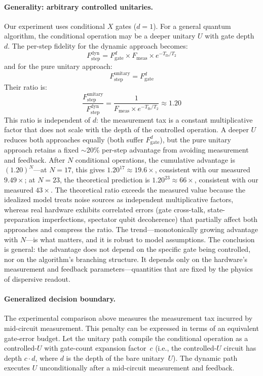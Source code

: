 \documentclass[11pt]{article}
\begin{document}
\paragraph{Generality: arbitrary controlled unitaries.}
Our experiment uses conditional $X$ gates ($d = 1$).
For a general quantum algorithm, the conditional operation may be a deeper unitary $U$ with gate depth $d$.
The per-step fidelity for the dynamic approach becomes:
\begin{equation}
F_\text{step}^\text{dyn} = F_\text{gate}^d \times F_\text{meas} \times e^{-T_\text{fb}/T_2}
\end{equation}
and for the pure unitary approach:
\begin{equation}
F_\text{step}^\text{unitary} = F_\text{gate}^d
\end{equation}
Their ratio is:
\begin{equation}
\frac{F_\text{step}^\text{unitary}}{F_\text{step}^\text{dyn}} = \frac{1}{F_\text{meas} \times e^{-T_\text{fb}/T_2}} \approx 1.20
\label{eq:ratio}
\end{equation}
This ratio is independent of $d$: the measurement tax is a constant multiplicative factor that does not scale with the depth of the controlled operation.
A deeper $U$ reduces both approaches equally (both suffer $F_\text{gate}^d$), but the pure unitary approach retains a fixed $\sim$20\% per-step advantage from avoiding measurement and feedback.
After $N$ conditional operations, the cumulative advantage is $(1.20)^N$---at $N = 17$, this gives $1.20^{17} \approx 19.6\times$, consistent with our measured $9.49\times$; at $N = 23$, the theoretical prediction is $1.20^{23} \approx 66\times$, consistent with our measured $43\times$.
The theoretical ratio exceeds the measured value because the idealized model treats noise sources as independent multiplicative factors, whereas real hardware exhibits correlated errors (gate cross-talk, state-preparation imperfections, spectator qubit decoherence) that partially affect both approaches and compress the ratio.
The trend---monotonically growing advantage with $N$---is what matters, and it is robust to model assumptions.
The conclusion is general: the advantage does not depend on the specific gate being controlled, nor on the algorithm's branching structure.
It depends only on the hardware's measurement and feedback parameters---quantities that are fixed by the physics of dispersive readout.

\paragraph{Generalized decision boundary.}
The experimental comparison above measures the measurement tax incurred by mid-circuit measurement.
This penalty can be expressed in terms of an equivalent gate-error budget.
Let the unitary path compile the conditional operation as a controlled-$U$ with gate-count expansion factor~$c$ (i.e., the controlled-$U$ circuit has depth $c\cdot d$, where $d$ is the depth of the bare unitary~$U$).
The dynamic path executes $U$ unconditionally after a mid-circuit measurement and feedback.
\end{document}
